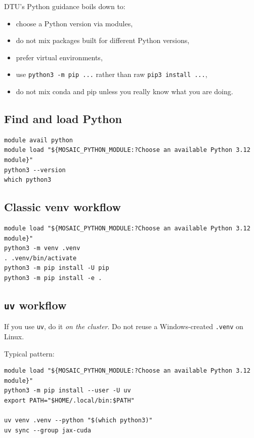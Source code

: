 \documentclass[11pt,a4paper]{article}
\begin{document}
DTU's Python guidance boils down to:

\begin{itemize}[leftmargin=1.5em]
  \item choose a Python version via modules,
  \item do not mix packages built for different Python versions,
  \item prefer virtual environments,
  \item use \texttt{python3 -m pip ...} rather than raw \texttt{pip3 install ...},
  \item do not mix conda and pip unless you really know what you are doing.
\end{itemize}

\subsection{Find and load Python}

\begin{lstlisting}[style=shell]
module avail python
module load "${MOSAIC_PYTHON_MODULE:?Choose an available Python 3.12 module}"
python3 --version
which python3
\end{lstlisting}

\subsection{Classic venv workflow}

\begin{lstlisting}[style=shell]
module load "${MOSAIC_PYTHON_MODULE:?Choose an available Python 3.12 module}"
python3 -m venv .venv
. .venv/bin/activate
python3 -m pip install -U pip
python3 -m pip install -e .
\end{lstlisting}

\subsection{\texttt{uv} workflow}

If you use \texttt{uv}, do it \emph{on the cluster}. Do not reuse a Windows-created \texttt{.venv} on Linux.

Typical pattern:

\begin{lstlisting}[style=shell]
module load "${MOSAIC_PYTHON_MODULE:?Choose an available Python 3.12 module}"
python3 -m pip install --user -U uv
export PATH="$HOME/.local/bin:$PATH"

uv venv .venv --python "$(which python3)"
uv sync --group jax-cuda
\end{lstlisting}
\end{document}
